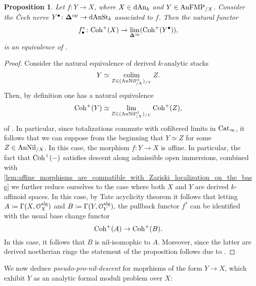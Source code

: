 \documentclass[10pt,a4paper,reqno]{amsart} %
\theoremstyle{plain}
\newtheorem{prop}[thm]{Proposition}
\theoremstyle{definition}
\theoremstyle{remark}
\numberwithin{equation}{section}
\begin{document}
\begin{prop} \label{prop:nil_descent_for_Coh^+}
    Let $f \colon Y \to X$, where $X \in \mathrm{dAn}_k$ and $Y \in \mathrm{AnFMP}_{/X}$. Consider the \v{C}ech nerve
    $Y^\bullet \colon \mathbf \Delta ^\mathrm{op} \to \mathrm{dAnSt}_k$ associated to $f$.
    Then the natural functor
        \[
            f_\bullet^* \colon \mathrm{Coh}^+(X) \to \lim_{\bm{\Delta} ^\mathrm{op}}(\mathrm{Coh}^+(Y^\bullet)),  
        \]
    is an equivalence of \infcats.
\end{prop}

\begin{proof}
    Consider the natural equivalence of derived $k$-analytic stacks
        \[
            Y \simeq \operatorname*{colim}_{Z \in (\mathrm{AnNil}^{\mathrm{cl}}_{/X})_{/Y}}  Z.
        \]
    Then, by definition one has a natural equivalence
        \[
            \mathrm{Coh}^+(Y) \simeq \lim_{Z \in (\mathrm{AnNil}^{\mathrm{cl}}_{/X})_{/Y}} \mathrm{Coh}^+(Z),  
        \]
    of \infcats. In particular, since totalizations commute with cofiltered limits in $\mathrm{Cat}_\infty$, it follows that we can suppose from
    the beginning that $Y \simeq Z$ for some $Z \in \mathrm{AnNil}_{/X}$. In this case, the morphism $f \colon Y \to X$ is affine. In particular, the fact that
    $\mathrm{Coh}^+(-)$ satisfies descent along admissible open immersions, combined with \cref{lem:affine_morphisms_are_compatible_with_Zariski_localization_on_the_base} we further reduce ourselves
    to the case where both $X$ and $Y$ are derived $k$-affinoid spaces. In this case, by Tate acyclicity
    theorem it follows that letting $A \coloneqq \Gamma(X, \mathcal O_X ^\mathrm{alg})$ and $B \coloneqq \Gamma(Y, \mathcal O_Y^\mathrm{alg}),$ the pullback functor $f^*$ can be identified with
    the usual base change functor
        \[
            \mathrm{Coh}^+(A) \to \mathrm{Coh}^+(B).  
        \]
    In this case, it follows that $B$ is nil-isomophic to $A$. Moreover, since the latter are derived noetherian rings
    the statement of the proposition follows due to \cite[Theorem 3.3.1]{preygel_Leistner_Mapping_stacks_properness}.
\end{proof}

We now deduce \emph{pseudo-pro-nil-descent} for moprhisms of the form $Y \to X$, which exhibit $Y$ as an analytic formal moduli problem over $X$:
\end{document}

